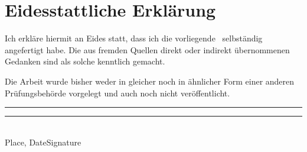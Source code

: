 \section*{\centering Eidesstattliche Erklärung}\thispagestyle{plain}\label{oath}
Ich erkläre hiermit an Eides statt, dass ich die vorliegende \thesis\ selbständig angefertigt habe. Die aus fremden Quellen direkt oder indirekt übernommenen Gedanken sind als solche kenntlich gemacht.

Die Arbeit wurde bisher weder in gleicher noch in ähnlicher Form einer anderen Prüfungsbehörde vorgelegt und auch noch nicht veröffentlicht.

\vspace{2.5cm}

\rule{5cm}{0.2pt}\hfill\rule{5cm}{0.2pt}\\
\footnotesize\phantom{}\hspace{17mm} Place, Date\hfill Signature\hspace{17mm}
\clearpage\normalsize